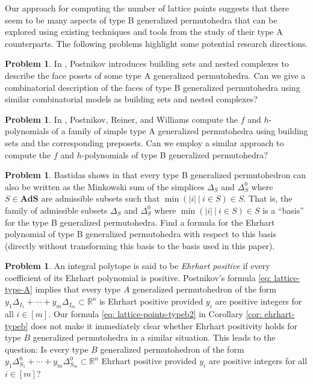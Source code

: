 \documentclass[12pt,reqno]{article}%
\theoremstyle{definition}
\numberwithin{equation}{section}
\newtheorem{op}[thm]{Problem}
\newcommand{\R}{\mathbb R}
\newcommand{\ads}{\mathbf{AdS}}
\newcommand{\sym}{\Delta^0}
\begin{document}
Our approach for computing the number of lattice points suggests that there seem to be many aspects of type B generalized permutohedra that can be explored using existing techniques and tools from the study of their type A counterparts. The following problems highlight some potential research directions.
\begin{op}
    In \cite[Section 7]{Postnikov2005}, Postnikov introduces building sets and nested complexes to describe the face posets of some type A generalized permutohedra. Can we give a combinatorial description of the faces of type B generalized permutohedra using similar combinatorial models as building sets and nested complexes?
\end{op}

\begin{op}
    In \cite{PostnikovEtal2008}, Postnikov, Reiner, and Williams compute the $f$ and $h$-polynomials of a family of simple type A generalized permutohedra using building sets and the corresponding preposets.  Can we employ a similar approach to compute the $f$ and $h$-polynomials of type B generalized permutohedra?
\end{op}

\begin{op}
    Bastidas shows in \cite{Bastidas2021} that every type B generalized permutohedron can also be written as the Minkowski sum of the simplices $\Delta_S$ and $\sym_S$ where $S \in \ads$ are admissible subsets such that $\min(|i|\ | \ i \in S) \in S.$ That is, the family of admissible subsets $\Delta_S$ and $\sym_S$ where $\min(|i|\ | \ i \in S) \in S$ is a ``basis'' for the type B generalized permutohedra. Find a formula for the Ehrhart polynomial of type B generalized permutohedra with respect to this basis (directly without transforming this basis to the basis used in this paper).
\end{op}

\begin{op}
    An integral polytope is said to be \emph{Ehrhart positive} if every coefficient of its Ehrhart polynomial is positive. Postnikov's formula \eqref{eq: lattice-type-A} implies that every type $A$ generalized permutohedron of the form $y_1\Delta_{I_1} + \cdots + y_m\Delta_{I_m} \subset \R^n$ is Ehrhart positive provided $y_i$ are positive integers for all $i\in [m]$. Our formula \eqref{eq: lattice-points-typeb2} in Corollary \ref{cor: ehrhart-typeb} does not make it immediately clear whether Ehrhart positivity holds for type $B$ generalized permutohedra in a similar situation. This leads to the question: Is every type $B$ generalized permutohedron of the form $y_1\sym_{S_1} + \cdots + y_m\sym_{S_m} \subset \mathbb{R}^n$ Ehrhart positive provided $y_i$ are positive integers for all $i \in [m]$?
\end{op}
\end{document}

